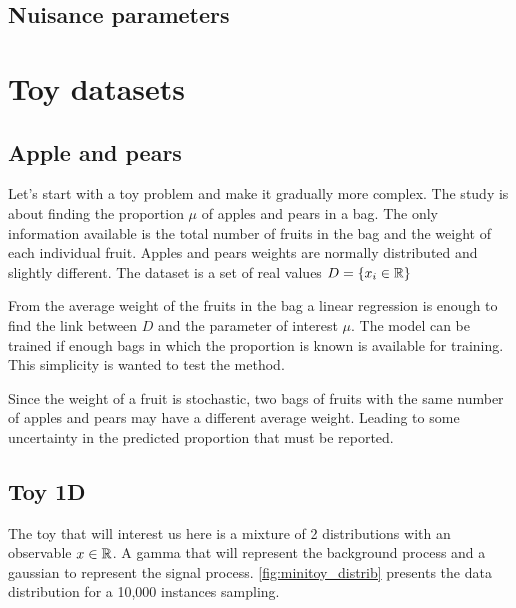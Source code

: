 \subsection{Nuisance parameters} %
\label{sub:nuisance_parameters}





\section{Toy datasets} %
\label{sec:toy_datasets}




\subsection{Apple and pears} %
\label{sub:apple_and_pears}

Let's start with a toy problem and make it gradually more complex.
The study is about finding the proportion $\mu$ of apples and pears in a bag.
The only information available is the total number of fruits in the bag and the weight of each individual fruit.
Apples and pears weights are normally distributed and slightly different.
The dataset is a set of real values $D = \{ x_i \in \mathbb{R} \} $

From the average weight of the fruits in the bag a linear regression is enough to find the link between $D$ and the parameter of interest $\mu$.
The model can be trained if enough bags in which the proportion is known is available for training.
This simplicity is wanted to test the method.

Since the weight of a fruit is stochastic, two bags of fruits with the same number of apples and pears may have a different average weight.
Leading to some uncertainty in the predicted proportion that must be reported.






\subsection{Toy 1D} %
\label{sub:toy_1d}

The toy that will interest us here is a mixture of 2 distributions with an observable $x \in \mathbb{R}$.
A gamma that will represent the background process and a gaussian to represent the signal process.
\autoref{fig:minitoy_distrib} presents the data distribution for a 10,000 instances sampling.

